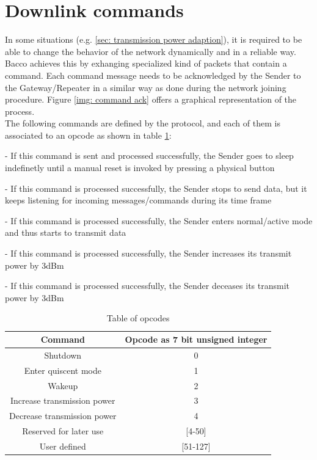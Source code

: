 \section{Downlink commands}
In some situations (e.g. \ref{sec: transmission power adaption}), it is required to be able to change the behavior of the
network dynamically and in a reliable way. Bacco achieves this by exhanging specialized kind of packets that contain a
command. Each command message needs to be acknowledged by the Sender to the Gateway/Repeater in a similar way as done during the
network joining procedure. Figure \ref{img: command ack} offers a graphical representation of the process.\\
The following commands are defined by the protocol, and each of them is associated to an opcode as shown in table
\ref{tab: opcodes}:
\begin{description}[font=$\bullet$~\normalfont\scshape\color{blue!50!black}]
    \item [Shutdown] - If this command is sent and processed successfully, the Sender goes to sleep indefinetly until a
        manual reset is invoked by pressing a physical button
    \item [Enter quiescent mode] - If this command is processed successfully, the Sender stops to send data, but it keeps
        listening for incoming messages/commands during its time frame
    \item [Wakeup] - If this command is processed successfully, the Sender enters normal/active mode
        and thus starts to transmit data
    \item [Increase transmission power] - If this command is processed successfully, the Sender increases its
        transmit power by 3dBm
    \item [Decrease transmission power] - If this command is processed successfully, the Sender deceases its
        transmit power by 3dBm
\end{description}

\begin{table}[h]
    \centering
    \begin{tabular}{ |c|c| }
        \hline
        \textbf{Command} & \textbf{Opcode as 7 bit unsigned integer}\\
        \hline
        Shutdown & 0\\
        \hline
        Enter quiscent mode & 1\\
        \hline
        Wakeup & 2\\
        \hline
        Increase transmission power & 3\\
        \hline
        Decrease transmission power & 4\\
        \hline
        Reserved for later use & [4-50]\\
        \hline
        User defined & [51-127]\\
        \hline
    \end{tabular}
    \caption{Table of opcodes}
    \label{tab: opcodes}
\end{table}

